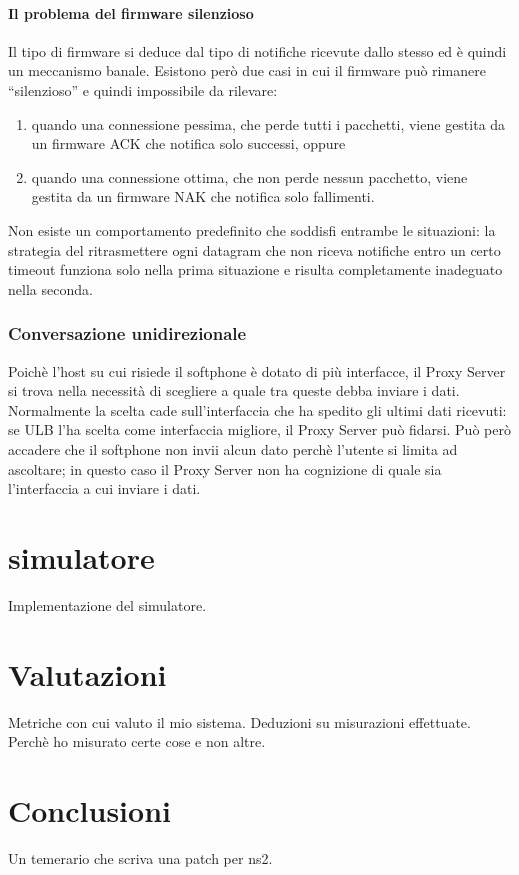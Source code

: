 \documentclass[12pt,a4paper,openright,twoside]{book}
\begin{document}
\subsubsection{Il problema del firmware silenzioso}
Il tipo di firmware si deduce dal tipo di notifiche ricevute dallo
stesso ed è quindi un meccanismo banale. Esistono però due casi in cui
il firmware può rimanere ``silenzioso'' e quindi impossibile da
rilevare:
\begin{enumerate}
\item quando una connessione pessima, che perde tutti i pacchetti,
  viene gestita da un firmware ACK che notifica solo successi, oppure
\item quando una connessione ottima, che non perde nessun pacchetto,
  viene gestita da un firmware NAK che notifica solo fallimenti.
\end{enumerate}
Non esiste un comportamento predefinito che soddisfi entrambe le
situazioni: la strategia del ritrasmettere ogni datagram che non
riceva notifiche entro un certo timeout funziona solo nella prima
situazione e risulta completamente inadeguato nella seconda.

\subsection{Conversazione unidirezionale}
Poichè l'host su cui risiede il softphone è dotato di più interfacce,
il Proxy Server si trova nella necessità di scegliere a quale tra
queste debba inviare i dati. Normalmente la scelta cade
sull'interfaccia che ha spedito gli ultimi dati ricevuti: se ULB l'ha
scelta come interfaccia migliore, il Proxy Server può fidarsi. Può
però accadere che il softphone non invii alcun dato perchè l'utente si
limita ad ascoltare; in questo caso il Proxy Server non ha cognizione
di quale sia l'interfaccia a cui inviare i dati.

\chapter{simulatore}
Implementazione del simulatore.

\chapter{Valutazioni}
Metriche con cui valuto il mio sistema. Deduzioni su misurazioni
effettuate. Perchè ho misurato certe cose e non altre.

\chapter*{Conclusioni}
Un temerario che scriva una patch per ns2.
\end{document}
